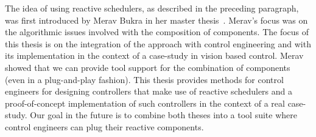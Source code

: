 \documentclass[ twoside, 12pt ]{article}
\begin{document}
The idea of using reactive schedulers, as described in the preceding paragraph, was first introduced by Merav Bukra in her master thesis~\cite{Merav}. Merav's focus was on the algorithmic issues involved with the composition of components. The focus of this thesis is on the integration of the approach with control engineering and with its implementation in the context of a case-study in vision based control. Merav showed that we can provide tool support for the combination of components (even in a plug-and-play fashion). This thesis provides methods for control engineers for designing controllers that make use of reactive schedulers and a proof-of-concept implementation of such controllers in the context of a real case-study.
Our goal in the future is to combine both theses into a tool suite where control engineers can plug their reactive components.

\end{document}
